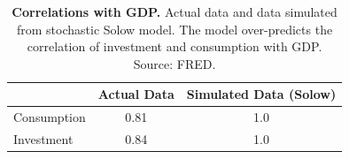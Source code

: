 \begin{table}[h] \caption{\label{tab013_intro_rbc_modeling_solow_corrs} \textbf{Correlations with GDP.} Actual data and data simulated from stochastic Solow model. The model over-predicts the correlation of investment and consumption with GDP. {\tiny Source: FRED}.}
\begin{center}\hspace*{-.5cm}

\begin{tabular}{lcc}
\toprule
{} &  Actual Data &  Simulated Data (Solow) \\
\midrule
Consumption &         0.81 &                     1.0 \\
Investment  &         0.84 &                     1.0 \\
\bottomrule
\end{tabular}
\end{center}
\end{table}